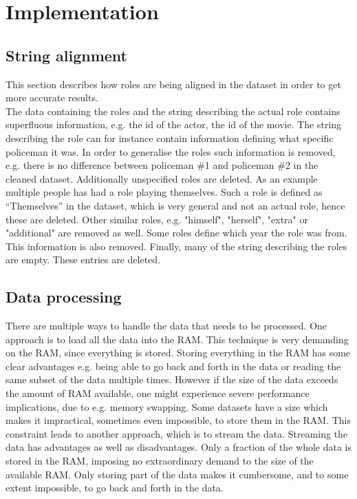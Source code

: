 \section{Implementation}

\subsection{String alignment}
This section describes how roles are being aligned in the dataset in order to get more accurate results.\\
The data containing the roles and the string describing the actual role contains superfluous information, e.g. the id of the actor, the id of the movie. The string describing the role can for instance contain information defining what specific policeman it was. In order to generalise the roles such information is removed, e.g. there is no difference between policeman \#1 and policeman \#2 in the cleaned dataset. Additionally unspecified roles are deleted. As an example multiple people has had a role playing themselves. Such a role is defined as “Themselves” in the dataset, which is very general and not an actual role, hence these are deleted. Other similar roles, e.g. "himself", "herself", "extra" or "additional" are removed as well. Some roles define which year the role was from. This information is also removed. Finally, many of the string describing the roles are empty. These entries are deleted.

\subsection{Data processing}
There are multiple ways to handle the data that needs to be processed.
One approach is to load all the data into the RAM. This technique is very demanding on the RAM, since everything is stored. Storing everything in the RAM has some clear advantages e.g. being able to go back and forth in the data or reading the same subset of the data multiple times. However if the size of the data exceeds the amount of RAM available, one might experience severe performance implications, due to e.g. memory swapping.
Some datasets have a size which makes it impractical, sometimes even impossible, to store them in the RAM. This constraint leads to another approach, which is to stream the data. Streaming the data has advantages as well as disadvantages. Only a fraction of the whole data is stored in the RAM, imposing no extraordinary demand to the size of the available RAM. Only storing part of the data makes it cumbersome, and to some extent impossible, to go back and forth in the data.

